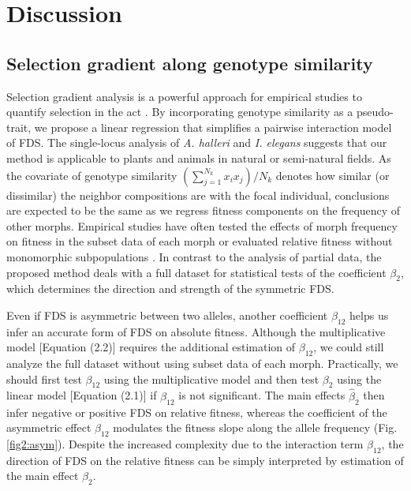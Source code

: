 \documentclass[12pt,]{article}
\begin{document}
\section{Discussion}

\subsection{Selection gradient along genotype similarity}
Selection gradient analysis is a powerful approach for empirical studies to quantify selection in the act \citep{lande1983measurement, mitchell1987regression, chong2018note}. By incorporating genotype similarity as a pseudo-trait, we propose a linear regression that simplifies a pairwise interaction model of FDS. The single-locus analysis of \textit{A. halleri} and \textit{I. elegans} suggests that our method is applicable to plants and animals in natural or semi-natural fields. As the covariate of genotype similarity $(\sum^{N_k}_{j=1}x_i x_j)/N_k$ denotes how similar (or dissimilar) the neighbor compositions are with the focal individual, conclusions are expected to be the same as we regress fitness components on the frequency of other morphs. Empirical studies have often tested the effects of morph frequency on fitness in the subset data of each morph \citep{mccauley1998frequency, bennington1998field, sato2017herbivore} or evaluated relative fitness without monomorphic subpopulations \citep{gigord2001negative, takahashi2010negative}. In contrast to the analysis of partial data, the proposed method deals with a full dataset for statistical tests of the coefficient $\beta_2$, which determines the direction and strength of the symmetric FDS.

Even if FDS is asymmetric between two alleles, another coefficient $\beta_{12}$ helps us infer an accurate form of FDS on absolute fitness. Although the multiplicative model [Equation (2.2)] requires the additional estimation of $\beta_{12}$, we could still analyze the full dataset without using subset data of each morph. Practically, we should first test $\beta_{12}$ using the multiplicative model and then test $\beta_2$ using the linear model [Equation (2.1)] if $\beta_{12}$ is not significant. The main effects $\hat{\beta}_{2}$ then infer negative or positive FDS on relative fitness, whereas the coefficient of the asymmetric effect $\beta_{12}$ modulates the fitness slope along the allele frequency (Fig. \ref{fig2:asym}). Despite the increased complexity due to the interaction term $\beta_{12}$, the direction of FDS on the relative fitness can be simply interpreted by estimation of the main effect $\beta_2$.
\end{document}
